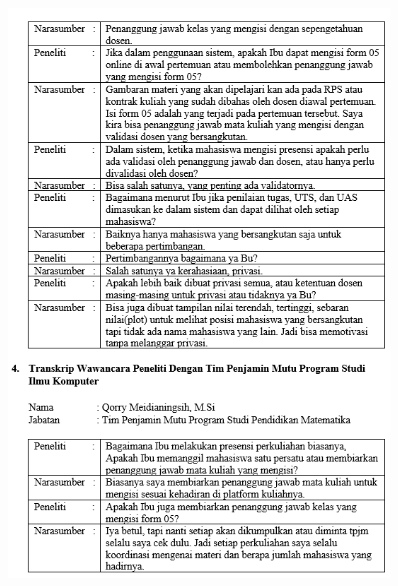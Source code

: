 \begin{figure}[H]
	\centering
	\includegraphics[width=0.9\textwidth]{gambar/lampiran/UR-3}	
\end{figure}
